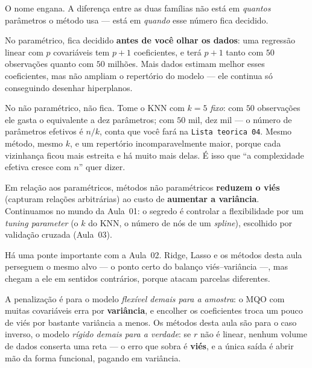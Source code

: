 \documentclass[11pt,a4paper]{article}
\begin{document}
\begin{atencao}
O nome engana. A diferença entre as duas famílias não está em \emph{quantos}
parâmetros o método usa --- está em \emph{quando} esse número fica decidido.

No paramétrico, fica decidido \textbf{antes de você olhar os dados}: uma regressão
linear com $p$ covariáveis tem $p+1$ coeficientes, e terá $p+1$ tanto com $50$
observações quanto com $50$ milhões. Mais dados estimam melhor esses coeficientes,
mas não ampliam o repertório do modelo --- ele continua só conseguindo desenhar
hiperplanos.

No não paramétrico, não fica. Tome o KNN com $k=5$ \emph{fixo}: com $50$ observações
ele gasta o equivalente a dez parâmetros; com $50$ mil, dez mil --- o número de
parâmetros efetivos é $n/k$, conta que você fará na \texttt{Lista teorica 04}. Mesmo
método, mesmo $k$, e um repertório incomparavelmente maior, porque cada vizinhança
ficou mais estreita e há muito mais delas. É isso que ``a complexidade efetiva
cresce com $n$'' quer dizer.
\end{atencao}

\begin{ideia}
Em relação aos paramétricos, métodos não paramétricos \textbf{reduzem o viés}
(capturam relações arbitrárias) ao custo de \textbf{aumentar a variância}.
Continuamos no mundo da Aula~01: o segredo é controlar a flexibilidade por um
\emph{tuning parameter} (o $k$ do KNN, o número de nós de um \emph{spline}),
escolhido por
validação cruzada (Aula~03).
\end{ideia}

\begin{observacao}
Há uma ponte importante com a Aula~02. Ridge, Lasso e os métodos desta aula
perseguem o mesmo alvo --- o ponto certo do balanço viés--variância ---, mas chegam
a ele em sentidos contrários, porque atacam parcelas diferentes.

A penalização é para o modelo \emph{flexível demais para a amostra}: o MQO com
muitas covariáveis erra por \textbf{variância}, e encolher os coeficientes troca um
pouco de viés por bastante variância a menos. Os métodos desta aula são para o caso
inverso, o modelo \emph{rígido demais para a verdade}: se $r$ não é linear, nenhum
volume de dados conserta uma reta --- o erro que sobra é \textbf{viés}, e a única
saída é abrir mão da forma funcional, pagando em variância.
\end{observacao}
\end{document}
